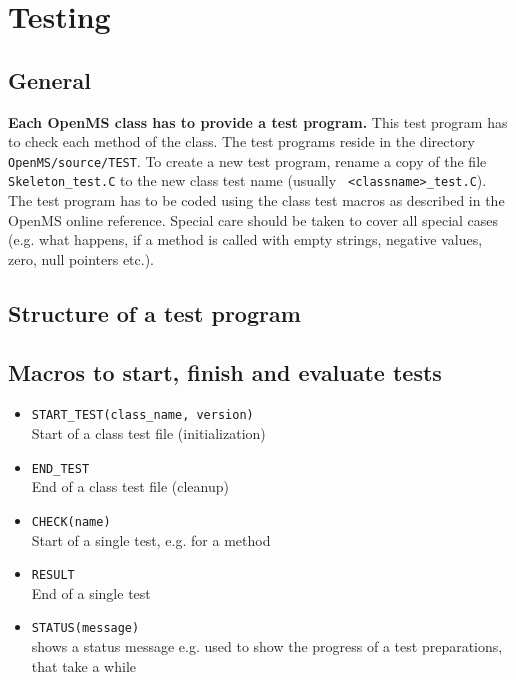 \documentclass[a4]{article}
\begin{document}
\section{Testing} 

\subsection{General}

{\bf Each OpenMS class has to provide a test program.} This test program has to check
each method of the class. The test programs reside in the directory
{\tt OpenMS/source/TEST}. To create a new test program, rename a copy of the file
{\tt Skeleton\_test.C} to the new class test name (usually {\tt
<classname>\_test.C}). The test program has to be coded using the class test
macros as described in the OpenMS online reference. Special care should be taken
to cover all special cases (e.g. what happens, if a method is called with
empty strings, negative values, zero, null pointers etc.).


\subsection{Structure of a test program}

\subsection{Macros to start, finish and evaluate tests}
\begin{itemize}
        \item {\tt START\_TEST(class\_name, version)} \\ Start of a class test file (initialization)
        \item {\tt END\_TEST} \\ End of a class test file (cleanup)
        \item {\tt CHECK(name)} \\ Start of a single test, e.g. for a method
        \item {\tt RESULT} \\ End of a single test
        \item {\tt STATUS(message)} \\ shows a status message e.g. used to show the progress of a test preparations, that take a while
\end{itemize}
\end{document}
